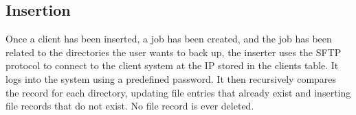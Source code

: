 \subsection*{Insertion}
Once a client has been inserted, a job has been created, and the job has been related to the directories the user wants to back up, the inserter uses the SFTP protocol to connect to the client system at the IP stored in the clients table. It logs into the system using a predefined password. It then recursively compares the record for each directory, updating file entries that already exist and inserting file records that do not exist. No file record is ever deleted.


 
